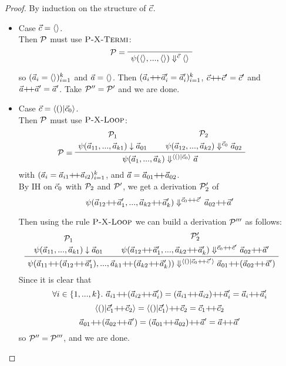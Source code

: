 \begin{proof}
\def\cc{\c {\++} \c'}
\def\aap#1{\a_{#1} {\++} \a_{#1}'}

	By induction on the structure of $\vec c$. 
	\begin{itemize}
		\item Case $\vec c = \langle \rangle$. \\
		Then $\mathcal{P}$ must use $\textsc{P-X-Termi}$:
		$$\PT{\LeLa{\MP = }
			  \Axiom{\sevalf{\emptyv}{\emptyv}{\c}{\emptyv}}
		  }$$
		
		so $(\vec a_i=\langle \rangle)^k_{i=1}$ and $\vec a = \langle \rangle$.
		Then $\k{\aap{i} = \a_i'}$, $\cc = \c' $ and $\a {\++} \a' = \a'$. Take $\mathcal{P}''
		= \mathcal{P}'$ and we are done. 
		
		\item Case $\c = \< () | \c_0 \'>$. \\ 
		Then $\mathcal{P}$ must use $\textsc{P-X-Loop}$: 
		$$
		\PT{
			\UCN{\MP_1}{\block{\a_{11}}{\a_{k1}}{\a_{01}}}
			\UCN{\MP_2}{\sevalf{\a_{12}}{\a_{k2}}{\c_0}{\a_{02}}}
 			\LeLa{\MP = }
			\BC{\sevalf{\a_1}{\a_k}{\< () | \c_0 \'>}{\a}}
		}$$
	    with $\k{\a_i = \vapp{\a_{i1}}{\a_{i2}}}$, and $\a = \a_{01} {\++} \a_{02}$.\\
	    
	    By IH on $\vec c_0$ with $\mathcal{P}_2$ and $\mathcal{P}'$, we get a derivation $\mathcal{P}'_2$ of 
	    $$\sevalfg{\lcall}{\a_{12} {\++} \a_1',...,\a_{k2} {\++} \a_k'}{\c_0 {\++} \c' }{\a_{02} {\++} \a'}$$
	    
	    Then using the rule $\textsc{P-X-Loop}$ we can build a derivation $\mathcal{P}'''$ as follows:
	    	$$
	    \PT{
	    	\UCN{\MP_{1}}{\block{\a_{11}}{\a_{k1}}{\a_{01}}}
	    	\UCN{\MP'_{2}}{\sevalfg{\lcall}{\a_{12} {\++} \a_1',...,\a_{k2} {\++} \a_k'}{\c_0 {\++} \c' }{\a_{02} {\++} \a'}}
	    	\BC{\sevalf{\a_{11} {\++} {(\a_{12} {\++} \a_1')}}
	    		        {\a_{k1} {\++} {(\a_{k2} {\++} \a_k')}}
	    		        {\< () | \c_0 {\++} \c' \'>}
	    		        {\a_{01} {\++} {(\a_{02} {\++} \a')}}}
	    }$$
	    Since it is clear that 
	    $$\forall i \in \{1,...,k\}. \ \a_{i1} {\++} (\a_{i2} {\++} \a_i') = (\a_{i1} {\++} \a_{i2}) {\++} \a_i' = \a_i {\++} \a_i' $$
	    $$ \< () | \c_1' {\++} \c_2 \'> = \< () | \c_1' \'> {\++} \c_2 = \c_1 {\++} \c_2 $$
	    $$ \a_{01} {\++} (\a_{02} {\++} \a') = (\a_{01} {\++} \a_{02}) {\++} \a' = \a {\++}  \a' $$
	    so  $\mathcal{P}'' = \mathcal{P}'''$, and we are done. 
	    
	\end{itemize}
	
\end{proof}

